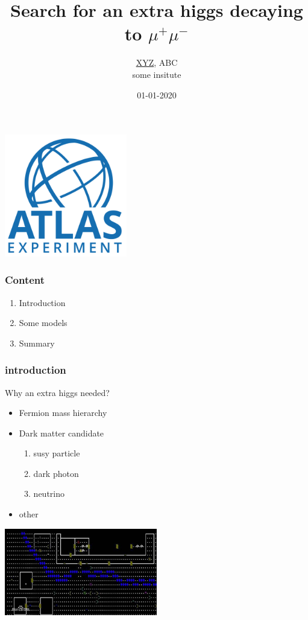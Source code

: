 \documentclass[10pt,reqno]{beamer}
\newcommand{\mup}{\mu^{+}}
\newcommand{\mum}{\mu^{-}}
\begin{document}
 

\begin{frame} 

\title{Search for an extra higgs decaying to $\mup\mum$}
\author{\underline{XYZ}, ABC \\ some insitute}
\date{01-01-2020}
\titlepage

\center
\includegraphics[width = 0.4\textwidth]{atlas_logo.png} 
\end{frame}

\begin{frame} 


\frametitle{Content}


\begin{enumerate}
\item Introduction
\item Some models
\item Summary
\end{enumerate} 




\end{frame} 

\begin{frame} 


\frametitle{introduction~\label{intro}}


Why an extra higgs needed?
\begin{itemize}
\item Fermion mass hierarchy
\item Dark matter candidate
\begin{enumerate}
\item susy particle
\item dark photon
\item neutrino
\end{enumerate} 

\item other
\end{itemize} 


\includegraphics[width = 0.5\textwidth]{fig/nethack.jpg} 



\end{frame} 
\end{document}
